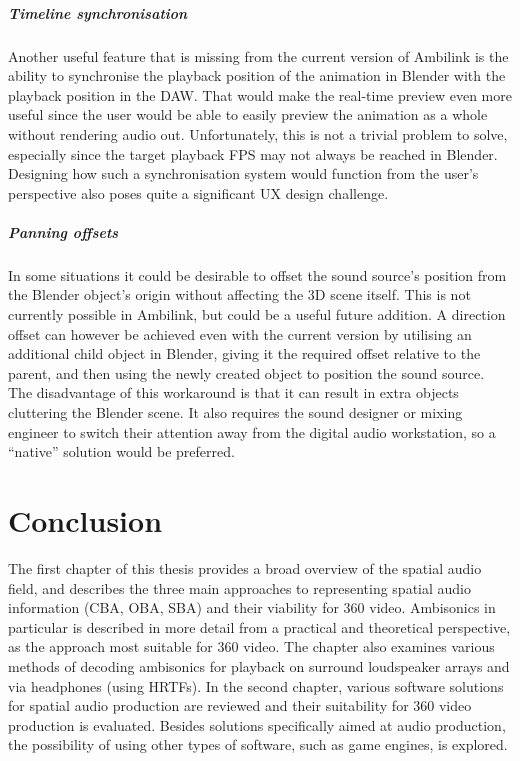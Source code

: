 \paragraph*{Timeline synchronisation}
Another useful feature that is missing from the current version of Ambilink is the ability
to synchronise the playback position of the animation in Blender with the playback position in the DAW.
That would make the real-time preview even more useful since the user would be able to easily 
preview the animation as a whole without rendering audio out.
Unfortunately, this is not a trivial problem to solve, especially since the target playback FPS
may not always be reached in Blender. Designing how such a synchronisation system 
would function from the user's perspective also poses quite a significant UX design challenge.

\paragraph*{Panning offsets}
In some situations it could be desirable to offset the sound source's
position from the Blender object's origin without affecting the 3D scene itself.
This is not currently possible in Ambilink, but could be a useful future addition.
A direction offset can however be achieved even with the current version by utilising an additional child object in Blender,
giving it the required offset relative to the parent, and then using the newly created object to position the sound source.
The disadvantage of this workaround is that it can result in extra objects cluttering the Blender scene.
It also requires the sound designer or mixing engineer to switch their attention away from the digital audio workstation, 
so a ``native'' solution would be preferred.


\chapter{Conclusion}
The first chapter of this thesis provides a broad overview of the spatial audio field, 
and describes the three main approaches to representing spatial audio information 
(CBA, OBA, SBA) and their viability for 360\degree{} video.
Ambisonics in particular is described in more detail from a practical and 
theoretical perspective, as the approach most suitable for 360\degree{} video.
The chapter also examines various methods of decoding ambisonics for playback on 
surround loudspeaker arrays and via headphones (using HRTFs).
In the second chapter, various software solutions for spatial audio 
production are reviewed and their suitability for 360\degree{} video production is evaluated.
Besides solutions specifically aimed at audio production, the possibility of using other
types of software, such as game engines, is explored.

